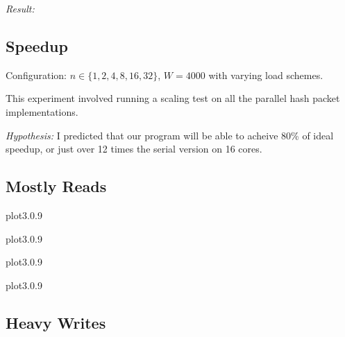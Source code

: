 \emph{Result: }


\subsection{Speedup}

Configuration: $n \in \{1, 2, 4, 8, 16, 32\}$, $W = 4000$ with varying load schemes.

This experiment involved running a scaling test on all the parallel
hash packet implementations.  

\emph{Hypothesis: } I predicted that our program will be able
to acheive 80\% of ideal speedup, or just over 12 times the serial
version on 16 cores.  

\subsection{Mostly Reads}

      {plot3.0}{.9}

      {plot3.0}{.9}

      {plot3.0}{.9}

      {plot3.0}{.9}



\subsection{Heavy Writes}





